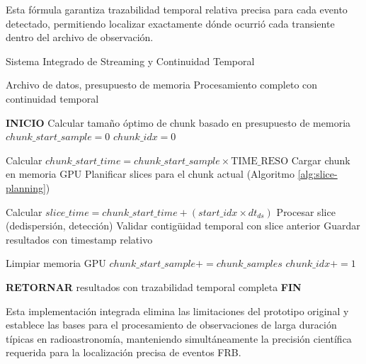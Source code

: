 Esta fórmula garantiza trazabilidad temporal relativa precisa para cada evento detectado, permitiendo localizar exactamente dónde ocurrió cada transiente dentro del archivo de observación.

\begin{algorithm}[H]
\caption{Sistema Integrado de Streaming y Continuidad Temporal}
\label{alg:streaming-continuity}
\begin{algorithmic}[1]
\Require Archivo de datos, presupuesto de memoria
\Ensure Procesamiento completo con continuidad temporal

\State \textbf{INICIO}
\State Calcular tamaño óptimo de chunk basado en presupuesto de memoria
\State $chunk\_start\_sample = 0$
\State $chunk\_idx = 0$

    \State Calcular $chunk\_start\_time = chunk\_start\_sample \times \text{TIME\_RESO}$
    \State Cargar chunk en memoria GPU
    \State Planificar slices para el chunk actual (Algoritmo \ref{alg:slice-planning})
    
        \State Calcular $slice\_time = chunk\_start\_time + (start\_idx \times dt_{ds})$
        \State Procesar slice (dedispersión, detección)
        \State Validar contigüidad temporal con slice anterior
        \State Guardar resultados con timestamp relativo
    \EndFor
    
    \State Limpiar memoria GPU
    \State $chunk\_start\_sample += chunk\_samples$
    \State $chunk\_idx += 1$
\EndWhile

\State \textbf{RETORNAR} resultados con trazabilidad temporal completa
\State \textbf{FIN}
\end{algorithmic}
\end{algorithm}

Esta implementación integrada elimina las limitaciones del prototipo original y establece las bases para el procesamiento de observaciones de larga duración típicas en radioastronomía, manteniendo simultáneamente la precisión científica requerida para la localización precisa de eventos FRB.


